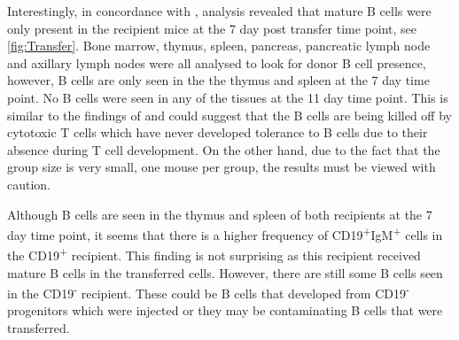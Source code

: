 Interestingly, in concordance with \citet{Serreze1998}, analysis revealed that mature B cells were only present in the recipient mice at the 7 day post transfer time point, see \cref{fig:Transfer}.
Bone marrow, thymus, spleen, pancreas, pancreatic lymph node and axillary lymph nodes were all analysed to look for donor B cell presence, however, B cells are only seen in the the thymus and spleen at the 7 day time point.
No B cells were seen in any of the tissues at the 11 day time point.
This is similar to the findings of \citet{Serreze1998} and could suggest that the B cells are being killed off by cytotoxic T cells which have never developed tolerance to B cells due to their absence during T cell development.
On the other hand, due to the fact that the group size is very small, one mouse per group, the results must be viewed with caution.

Although B cells are seen in the thymus and spleen of both recipients at the 7 day time point, it seems that there is a higher frequency of CD19\textsuperscript{+}IgM\textsuperscript{+} cells in the CD19\textsuperscript{+} recipient.
This finding is not surprising as this recipient received mature B cells in the transferred cells.
However, there are still some B cells seen in the CD19\textsuperscript{-} recipient.
These could be B cells that developed from CD19\textsuperscript{-} progenitors which were injected or they may be contaminating B cells that were transferred.


